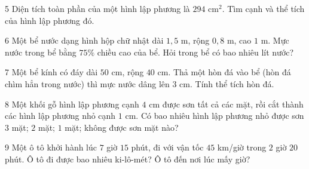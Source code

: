 \gap
\begin{probbox}{5}{\relax}
Diện tích toàn phần của một hình lập phương là $294$ cm$^2$. Tìm cạnh và thể tích của hình lập phương đó.
\end{probbox}
\gap
\begin{probbox}{6}{\relax}
Một bể nước dạng hình hộp chữ nhật dài $1{,}5$ m, rộng $0{,}8$ m, cao $1$ m. Mực nước trong bể bằng $75\%$ chiều cao của bể. Hỏi trong bể có bao nhiêu lít nước?
\end{probbox}
\gap
\begin{probbox}{7}{\relax}
Một bể kính có đáy dài $50$ cm, rộng $40$ cm. Thả một hòn đá vào bể (hòn đá chìm hẳn trong nước) thì mực nước dâng lên $3$ cm. Tính thể tích hòn đá.
\end{probbox}
\gap
\begin{probbox}{8}{\relax}
Một khối gỗ hình lập phương cạnh $4$ cm được sơn tất cả các mặt, rồi cắt thành các hình lập phương nhỏ cạnh $1$ cm. Có bao nhiêu hình lập phương nhỏ được sơn  $3$ mặt;  $2$ mặt;  $1$ mặt;  không được sơn mặt nào?
\end{probbox}
\gap
\begin{probbox}{9}{\relax}
Một ô tô khởi hành lúc $7$ giờ $15$ phút, đi với vận tốc $45$ km/giờ trong $2$ giờ $20$ phút.  Ô tô đi được bao nhiêu ki-lô-mét?  Ô tô đến nơi lúc mấy giờ?
\end{probbox}
